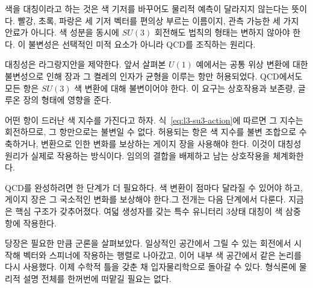 색을 대칭이라고 하는 것은 색 기저를 바꾸어도 물리적 예측이 달라지지 않는다는 뜻이다. 빨강, 초록, 파랑은 세 기저 벡터를 편의상 부르는 이름이지, 관측 가능한 세 가지 안료가 아니다. 색 성분을 동시에 \(SU(3)\) 회전해도 법칙의 형태는 변하지 않아야 한다. 이 불변성은 선택적인 미적 요소가 아니라 QCD를 조직하는 원리다.

대칭성은 라그랑지안을 제약한다. 앞서 살펴본 \(U(1)\) 예에서는 공통 위상 변환에 대한 불변성으로 인해 장과 그 켤레의 인자가 균형을 이루는 항만 허용되었다. QCD에서도 모든 항은 \(SU(3)\) 색 변환에 대해 불변이어야 한다. 이 요구는 상호작용과 보존량, 글루온 장의 형태에 영향을 준다.

어떤 항이 드러난 색 지수를 가진다고 하자. 식~\eqref{eq:l3-su3-action}에 따르면 그 지수는 회전하므로, 그 항만으로는 불변일 수 없다. 허용되는 항은 색 지수를 불변 조합으로 수축하거나, 변환으로 인한 변화를 보상하는 게이지 장을 사용해야 한다. 이것이 대칭성 원리가 실제로 작용하는 방식이다. 임의의 결합을 배제하고 남는 상호작용을 체계화한다.

QCD를 완성하려면 한 단계가 더 필요하다. 색 변환이 점마다 달라질 수 있어야 하고, 게이지 장은 그 국소적인 변화를 보상해야 한다.그 전개는 다음 단계에서 다룬다. 지금은 핵심 구조가 갖추어졌다. 여덟 생성자를 갖는 특수 유니터리 3상태 대칭이 색 삼중항에 작용한다.

당장은 필요한 만큼 군론을 살펴보았다. 일상적인 공간에서 그릴 수 있는 회전에서 시작해 벡터와 스피너에 작용하는 행렬로 나아갔고, 이어 내부 색 공간에서 같은 논리를 다시 사용했다. 이제 수학적 틀을 갖춘 채 입자물리학으로 돌아갈 수 있다. 형식론에 물리적 설명 전체를 한꺼번에 떠맡길 필요는 없다.